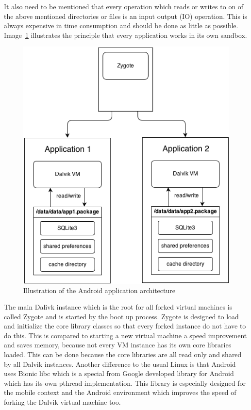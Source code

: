 It also need to be mentioned that every operation which reads or writes to on of the above mentioned directories or files is an input output (IO) operation.
This is always expensive in time consumption and should be done as little as possible.
Image~\ref{fig:zygote-and-app} illustrates the principle that every application works in its own sandbox.\\
\begin{figure}[h]
\begin{center}
\includegraphics[scale=0.65]{images/zygote-and-app.png} 
\caption{Illustration of the Android application architecture}
\label{fig:zygote-and-app}
\end{center}
\end{figure}
The main Dalivk instance which is the root for all forked virtual machines is called Zygote and is started by the boot up process.
Zygote is designed to load and initialize the core library classes so that every forked instance do not have to do this.
This is compared to starting a new virtual machine a speed improvement and saves memory, because not every VM instance has its own core libraries loaded.
This can be done because the core libraries are all read only and shared by all Dalvik instances.\cite{ehringer2010dalvik}
Another difference to the usual Linux is that Android uses Bionic libc which is a special from Google developed library for Android which has its own pthread implementation.
This library is especially designed for the mobile context and the Android environment which improves the speed of forking the Dalvik virtual machine too.~\cite{brady2008android}
\newpage
